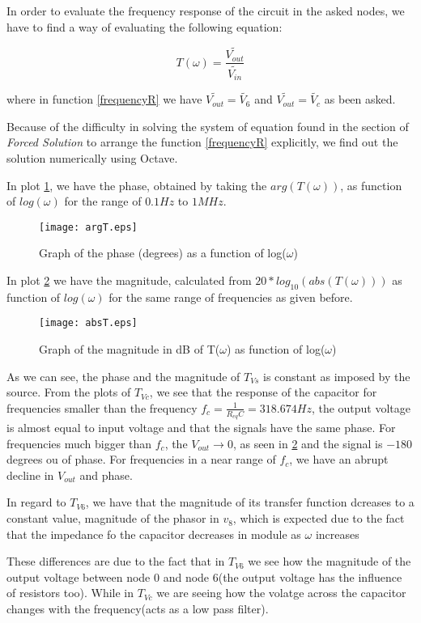 In order to evaluate the frequency response of the circuit in the asked nodes, we have to find a way of evaluating the following equation:

\begin{equation}
  T(\omega) = \frac{\widetilde{V_{out}}}{\widetilde{V_{in}}}
  \label{frequencyR}
\end{equation}

where in function \ref{frequencyR} we have $\widetilde{V_{out}} = \tilde{V_6}$ and $\widetilde{V_{out}} = \tilde{V_c}$ as been asked.

Because of the difficulty in solving the system of equation found in the section of \textit{Forced Solution} to arrange the function \ref{frequencyR} explicitly, we find out the solution numerically using Octave.

In plot \ref{fig:argT}, we have the phase, obtained by taking the $arg(T(\omega))$, as function of $log(\omega)$ for the range of $0.1Hz$ to $1MHz$.

\begin{figure}[h] \centering
  \texttt{[image: argT.eps]}
  \caption{Graph of the phase (degrees) as a function of log($\omega$)}
  \label{fig:argT}
\end{figure}

In plot \ref{fig:absT} we have the magnitude, calculated from $20*log_{10}(abs(T(\omega)))$ as function of $log(\omega)$ for the same range of frequencies as given before.

\begin{figure}[h] \centering
  \texttt{[image: absT.eps]}
  \caption{Graph of the magnitude in dB of T($\omega$) as function of log($\omega$) }
  \label{fig:absT}
\end{figure}


As we can see, the phase and the magnitude of $T_{Vs}$ is constant as imposed by the source.
From the plots of $T_{Vc}$, we see that the response of the capacitor for frequencies smaller than the frequency $f_c = \frac{1}{R_{eq}C} = 318.674 Hz$, the output voltage is almost equal to input voltage and that the signals have the same phase.
For frequencies much bigger than $f_c$, the $V_{out} \rightarrow 0$, as seen  in \ref{fig:absT} and the signal is $-180$ degrees ou of phase.
For frequencies in a near range of $f_c$, we have an abrupt decline in $V_{out}$ and phase.

In regard to $T_{V6}$, we have that the magnitude of its transfer function dcreases to a constant value, magnitude of the phasor in $v_8$, which is expected due to the fact that the impedance fo the capacitor decreases in module as $\omega$ increases



These differences are due to the fact that in $T_{V6}$ we see how the magnitude of the output voltage between node 0 and node 6(the output voltage has the influence of resistors too). While in
$T_{Vc}$ we are seeing how the volatge across the capacitor changes with the frequency(acts as a low pass filter).